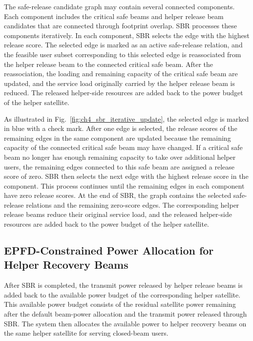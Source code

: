 The safe-release candidate graph may contain several connected components. Each component includes the critical safe beams and helper release beam candidates that are connected through footprint overlap. SBR processes these components iteratively. In each component, SBR selects the edge with the highest release score. The selected edge is marked as an active safe-release relation, and the feasible user subset corresponding to this selected edge is reassociated from the helper release beam to the connected critical safe beam. After the reassociation, the loading and remaining capacity of the critical safe beam are updated, and the service load originally carried by the helper release beam is reduced. The released helper-side resources are added back to the power budget of the helper satellite.

As illustrated in Fig.~\ref{fig:ch4_sbr_iterative_update}, the selected edge is marked in blue with a check mark. After one edge is selected, the release scores of the remaining edges in the same component are updated because the remaining capacity of the connected critical safe beam may have changed. If a critical safe beam no longer has enough remaining capacity to take over additional helper users, the remaining edges connected to this safe beam are assigned a release score of zero. SBR then selects the next edge with the highest release score in the component. This process continues until the remaining edges in each component have zero release scores. At the end of SBR, the graph contains the selected safe-release relations and the remaining zero-score edges. The corresponding helper release beams reduce their original service load, and the released helper-side resources are added back to the power budget of the helper satellite.

\subsection{EPFD-Constrained Power Allocation for Helper Recovery Beams}

After SBR is completed, the transmit power released by helper release beams is added back to the available power budget of the corresponding helper satellite. This available power budget consists of the residual satellite power remaining after the default beam-power allocation and the transmit power released through SBR. The system then allocates the available power to helper recovery beams on the same helper satellite for serving closed-beam users.

